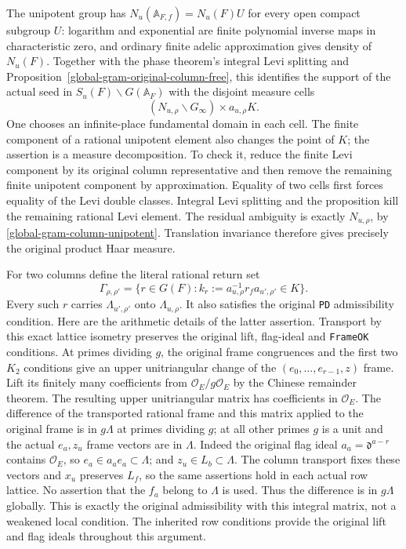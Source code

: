 The unipotent group has $N_u(\mathbb A_{F,f})=N_u(F)U$ for every
open compact subgroup $U$: logarithm and exponential are finite
polynomial inverse maps in characteristic zero, and ordinary finite
adelic approximation gives density of $N_u(F)$.  Together with the
phase theorem's integral Levi splitting and
Proposition~\ref{global-gram-original-column-free}, this identifies
the support of the actual seed in $S_u(F)\backslash G(\mathbb A_F)$
with the disjoint measure cells
\begin{equation}\label{global-gram-small-level-cells}
 (N_{u,\rho}\backslash G_\infty)\times a_{u,\rho}K.
\end{equation}
One chooses an infinite-place fundamental domain in each cell.
The finite component of a rational unipotent element also changes
the point of $K$; the assertion is a measure decomposition.
To check it, reduce the finite Levi component by its original
column representative and then remove the remaining finite
unipotent component by approximation.  Equality of two cells
first forces equality of the Levi double classes.  Integral Levi
splitting and the proposition kill the remaining rational Levi
element.  The residual ambiguity is exactly $N_{u,\rho}$, by
\eqref{global-gram-column-unipotent}.  Translation invariance
therefore gives precisely the original product Haar measure.

For two columns define the literal rational return set
\begin{equation}\label{global-gram-level-returns}
 \Gamma_{\rho,\rho'}=
 \{r\in G(F): k_r:=a_{u,\rho}^{-1}r_fa_{u',\rho'}\in K\}.
\end{equation}
Every such $r$ carries $\Lambda_{u',\rho'}$ onto
$\Lambda_{u,\rho}$.  It also satisfies the original
\texttt{PD} admissibility condition.  Here are the arithmetic
details of the latter assertion.  Transport by this exact lattice
isometry preserves the original lift, flag-ideal and
\texttt{FrameOK} conditions.  At primes dividing $g$, the original
frame congruences and the first two $K_2$ conditions give an upper
unitriangular change of the $(e_0,\ldots,e_{r-1},z)$ frame.
Lift its finitely many coefficients from
$\mathcal O_E/g\mathcal O_E$ by the Chinese remainder theorem.
The resulting upper unitriangular matrix has coefficients in
$\mathcal O_E$.  The difference of the transported rational frame
and this matrix applied to the original frame is in $g\Lambda$
at primes dividing $g$; at all other primes $g$ is a unit and
the actual $e_a,z_u$ frame vectors are in $\Lambda$.
Indeed the original flag ideal $a_a=\mathfrak d^{a-r}$ contains
$\mathcal O_E$, so $e_a\in a_ae_a\subset\Lambda$; and
$z_u\in L_b\subset\Lambda$.  The column transport fixes these
vectors and $x_u$ preserves $L_f$, so the same assertions hold in
each actual row lattice.  No assertion that the $f_a$ belong to
$\Lambda$ is used.  Thus the difference
is in $g\Lambda$ globally.  This is exactly the original
admissibility with this integral matrix, not a weakened local
condition.  The inherited row conditions provide the original
lift and flag ideals throughout this argument.
\cite{global-gram-period-source}

